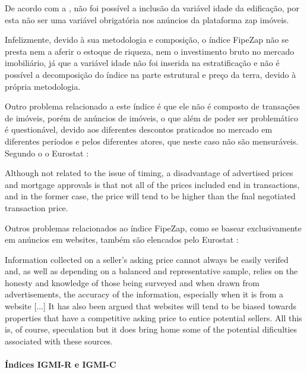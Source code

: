 \documentclass[
	12pt,				%
	oneside,			%
	a4paper,			%
	chapter=TITLE,		%
	section=TITLE,		%
	english,			%
	brazil				%
	]{abntex2}
\begin{document}
De acordo com a \textcite{fipezap}, não foi possível a inclusão da variável idade da
edificação, por esta não ser uma variável obrigatória nos anúncios da plataforma
zap imóveis.

Infelizmente, devido à sua metodologia e composição, o índice FipeZap não se
presta nem a aferir o estoque de riqueza, nem o investimento bruto no mercado
imobiliário, já que a variável idade não foi inserida na estratificação e não é
possível a decomposição do índice na parte estrutural e preço da terra, devido à
própria metodologia.

Outro problema relacionado a este índice é que ele não é composto de transações
de imóveis, porém de anúncios de imóveis, o que além de poder ser problemático é
questionável, devido aos diferentes descontos praticados no mercado em
diferentes períodos e pelos diferentes atores, que neste caso não são
mensuráveis. Segundo o o Eurostat \autocite*[126]{rppi}:
\begin{citacao}
Although not related to the issue of timing, a disadvantage of advertised
prices and mortgage approvals is that not all of the prices included end in
transactions, and in the former case, the price will tend to be higher than the
fnal negotiated transaction price.
\end{citacao}
Outros problemas relacionados ao índice FipeZap, como se basear exclusivamente
em anúncios em websites, também são elencados pelo Eurostat \autocite*[104]{rppi}:
\begin{citacao}
Information collected on a seller’s asking price cannot always be easily
verifed and, as well as depending on a balanced and representative sample,
relies on the honesty and knowledge of those being surveyed and when drawn from
advertisements, the accuracy of the information, especially when it is from a
website [...] It has also been argued that websites will tend to be biased
towards properties that have a competitive asking price to entice potential
sellers. All this is, of course, speculation but it does bring home some of the
potential dificulties associated with these sources.
\end{citacao}
\hypertarget{uxedndices-igmi-r-e-igmi-c}{%
\paragraph{Índices IGMI-R e IGMI-C}\label{uxedndices-igmi-r-e-igmi-c}}
\end{document}
